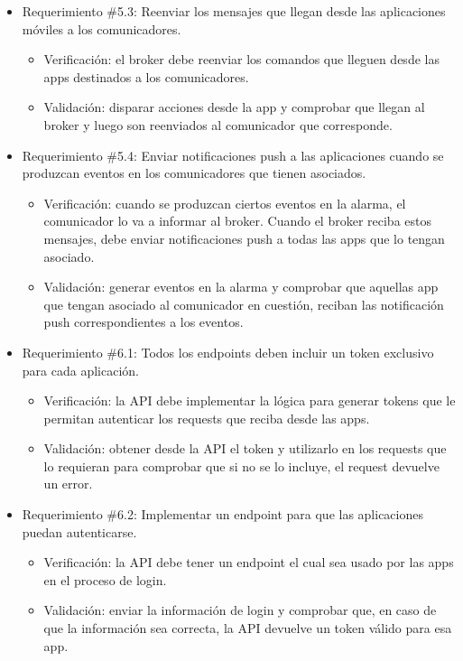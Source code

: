 \documentclass[
11pt, %
codirector, %
]{charter}
\begin{document}
\begin{itemize}
	\item Requerimiento \#5.3: Reenviar los mensajes que llegan desde las aplicaciones móviles a los comunicadores.
	\begin{itemize}
		\item Verificación: el broker debe reenviar los comandos que lleguen desde las apps destinados a los comunicadores.
		\item Validación: disparar acciones desde la app y comprobar que llegan al broker y luego son reenviados al comunicador que corresponde.
	\end{itemize}
			
	\item Requerimiento \#5.4: Enviar notificaciones push a las aplicaciones cuando se produzcan eventos en los comunicadores que tienen asociados.
	\begin{itemize}
		\item Verificación: cuando se produzcan ciertos eventos en la alarma, el comunicador lo va a informar al broker. Cuando el broker reciba estos mensajes, debe enviar notificaciones push a todas las apps que lo tengan asociado.
		\item Validación: generar eventos en la alarma y comprobar que aquellas app que tengan asociado al comunicador en cuestión, reciban las notificación push correspondientes a los eventos.
	\end{itemize}
			
	\item Requerimiento \#6.1: Todos los endpoints deben incluir un token exclusivo para cada aplicación.
	\begin{itemize}
		\item Verificación: la API debe implementar la lógica para generar tokens que le permitan autenticar los requests que reciba desde las apps.
		\item Validación: obtener desde la API el token y utilizarlo en los requests que lo requieran para comprobar que si no se lo incluye, el request devuelve un error.
	\end{itemize}
			
	\item Requerimiento \#6.2: Implementar un endpoint para que las aplicaciones puedan autenticarse.
	\begin{itemize}
		\item Verificación: la API debe tener un endpoint el cual sea usado por las apps en el proceso de login.
		\item Validación: enviar la información de login y comprobar que, en caso de que la información sea correcta, la API devuelve un token válido para esa app.
	\end{itemize}
			

\end{itemize}
\end{document}
